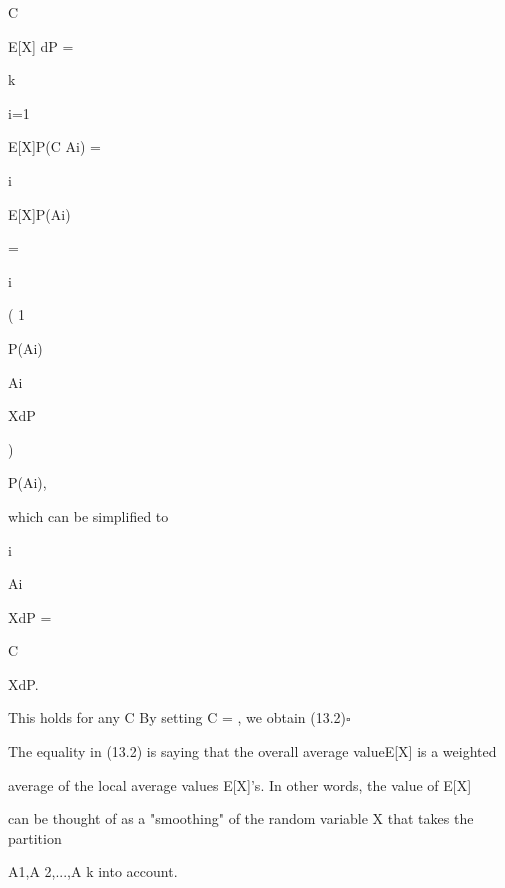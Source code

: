 \int

C

E[X\vert{}] dP =

k\sum

i=1

E[X\vertAi]\cdot P(C \cap Ai) =

\sum

i\inI

E[X\vertAi]P(Ai)

=

\sum

i\inI

( 1

P(Ai)

\int

Ai

XdP

)

P(Ai),

which can be simplified to

\sum

i\inI

\int

Ai

XdP =

\int

C

XdP.

This holds for any C \in{}By setting C = \Omega , we obtain (13.2)\hfill $\square$

The equality in (13.2) is saying that the overall average valueE[X] is a weighted

average of the local average values E[X\vertAi]'s. In other words, the value of E[X\vert{}]

can be thought of as a "smoothing" of the random variable X that takes the partition

A1,A 2,...,A k into account.
